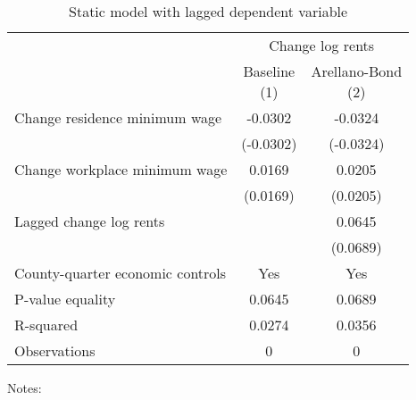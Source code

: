 \begin{table}
    \caption{Static model with lagged dependent variable}
    \label{tab:static_ab}

    \begin{tabular}{@{}lcc@{}}
        \toprule
                               & \multicolumn{2}{c}{Change log rents}                       \\ \cmidrule(l){2-3}
                               & \shortsack{Baseline\\(1)} & \shortsack{Arellano-Bond\\(2)} \\ \midrule
        Change residence minimum wage     &  -0.0302           &  -0.0324                           \\
                                          & (-0.0302)          & (-0.0324)                          \\
        Change workplace minimum wage     &  0.0169           & 0.0205                            \\
                                          & (0.0169)          & (0.0205)                          \\
        Lagged change log rents           &                & 0.0645                            \\
                                          &                & (0.0689)                          \\ \midrule
        County-quarter economic controls  & Yes            & Yes                            \\
        P-value equality                  & 0.0645            & 0.0689                            \\
        R-squared                         & 0.0274            & 0.0356                            \\
        Observations                      & 0           & 0                           \\ \bottomrule
    \end{tabular}

    \begin{minipage}{.95\textwidth} \footnotesize
        \vspace{2mm}
        Notes: 
    \end{minipage}
\end{table}
